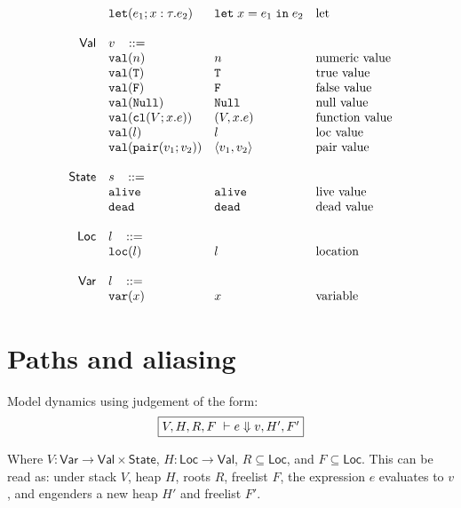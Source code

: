\documentclass[11pt]{article}
\newcommand{\ms}[1]{\ensuremath{\mathsf{#1}}}
\newcommand{\irl}[1]{\mathtt{#1}}
\begin{document}
\[\begin{array}{r l l l l}
  & \irl{let}(e_1; x : \tau.e_2)			& \irl{let}\; x = e_1 \; \irl{in}\; e_2   	& \text{let}\\
  \\
\ms{Val}
        & v   \,\,\,\,\, ::= \\
 	& \irl{val}(n)                                			& n 												& \text{numeric value}\\
 	& \irl{val}(\irl{T})                               			& \irl{T} 								  & \text{true value}\\
 	& \irl{val}(\irl{F})                                			& \irl{F}								  & \text{false value}\\
 	& \irl{val}(\irl{Null})                                  & \irl{Null} 								  & \text{null value}\\
 	& \irl{val}(\irl{cl}(V; x.e))                & (V, x.e) 					& \text{function value}\\
 	& \irl{val}(l)                                			& l 								  & \text{loc value}\\
 	& \irl{val}(\pairexabt{v_1}{v_2})                             & \pairexcst{v_1}{v_2} 								  & \text{pair value}\\
  \\
\ms{State} & s   \,\,\,\,\, ::= \\
 	& \irl{alive}                                			& \irl{alive} 												& \text{live value}\\
 	& \irl{dead}                                			& \irl{dead} 												& \text{dead value}\\\\
\ms{Loc} & l   \,\,\,\,\, ::= \\
 	& \irl{loc}(l)                                			& l 												& \text{location}\\\\
\ms{Var} & l   \,\,\,\,\, ::= \\
 	& \irl{var}(x)                                			& x 												& \text{variable}\\
\end{array}
\]
\section{Paths and aliasing}

Model dynamics using judgement of the form:
\[
\fbox{$V,H,R,F \; \vdash e \Downarrow v, H', F'$}
\]

\noindent
Where $V : \ms{Var} \to \ms{Val} \times \ms{State}$, $H : \ms{Loc} \to \ms{Val}$, $R \subseteq \ms{Loc}$, and $F \subseteq \ms{Loc}$. This can be read as: under stack $V$, heap $H$, roots $R$,
freelist $F$, the expression $e$ evaluates to $v$, and engenders a new heap $H'$ and freelist $F'$.\\
\end{document}
